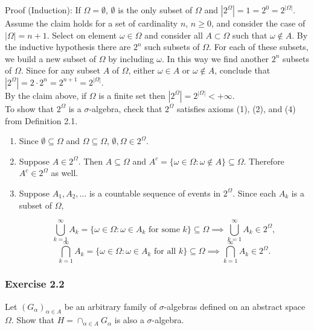 \documentclass{article}
\begin{document}
Proof (Induction): If $\Omega = \emptyset$, $\emptyset$ is the only subset of $\Omega$ and $|2^\Omega| = 1 = 2^0 = 2^{|\Omega|}$. Assume the claim holds for a set of cardinality $n$, $n \geq 0$, and consider the case of $|\Omega| = n+1$. Select on element $\omega \in \Omega$ and consider all $A \subset \Omega$ such that $\omega \notin A$. By the inductive hypothesis there are $2^n$ such subsets of $\Omega$. For each of these subsets, we build a new subset of $\Omega$ by including $\omega$. In this way we find another $2^n$ subsets of $\Omega$. Since for any subset $A$ of $\Omega$, either $\omega \in A$ or $\omega \notin A$, conclude that $|2^\Omega| = 2\cdot 2^n = 2^{n+1} = 2^{|\Omega|}$. \\

By the claim above, if $\Omega$ is a finite set then $|2^\Omega| = 2^{|\Omega|} < +\infty$. \\

To show that $2^\Omega$ is a $\sigma$-algebra, check that $2^\Omega$ satisfies axioms (1), (2), and (4) from Definition 2.1.

\begin{enumerate}
\item Since $\emptyset \subseteq \Omega$ and $\Omega \subseteq \Omega$, $\emptyset,\Omega \in 2^\Omega$.

\item Suppose $A \in 2^\Omega$. Then $A \subseteq \Omega$ and $A^c = \{\omega \in \Omega : \omega \notin A\} \subseteq \Omega$. Therefore $A^c \in 2^\Omega$ as well.


\item Suppose $A_1, A_2, \dots$ is a countable sequence of events in $2^\Omega$. Since each $A_k$ is a subset of $\Omega$,

$$\bigcup_{k=1}^\infty A_k = \{\omega \in \Omega : \omega \in A_k \text{ for some } k \} \subseteq \Omega \implies \bigcup_{k=1}^\infty A_k \in 2^\Omega,$$
$$\bigcap_{k=1}^\infty A_k = \{\omega \in \Omega : \omega \in A_k \text{ for all } k \} \subseteq \Omega \implies \bigcap_{k=1}^\infty A_k \in 2^\Omega.$$
\end{enumerate}

\subsubsection*{Exercise 2.2}

Let $(G_\alpha)_{\alpha \in A}$ be an arbitrary family of $\sigma$-algebras defined on an abstract
space $\Omega$. Show that $H = \cap_{\alpha \in A} G_\alpha$ is also a $\sigma$-algebra. \\
\end{document}
